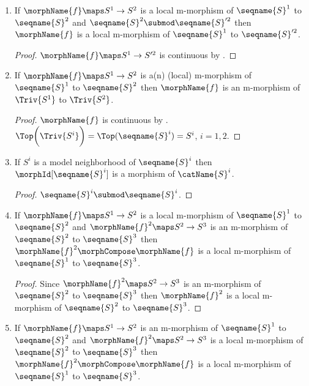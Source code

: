 \documentclass{article}
\begin{document}
\begin{corollary}
\begin{enumerate}
\end{enumerate}

\begin{enumerate}
\item
If $\morphName{f} \maps S^1 \to S^2$ is a local m-morphism of
$\seqname{S}^1$ to $\seqname{S}^2$ and
$\seqname{S}^2 \submod \seqname{S}'^2$ then
$\morphName{f}$ is a local m-morphism of $\seqname{S}^1$ to
$\seqname{S}'^2$.

\begin{proof}
$\morphName{f} \maps S^1 \to S'^2$ is continuous by
.
\end{proof}

\item
If $\morphName{f} \maps S^1 \to S^2$ is a(n) (local) m-morphism of
$\seqname{S}^1$ to $\seqname{S}^2$ then $\morphName{f}$ is an m-morphism
of $\Triv{S^1}$ to $\Triv{S^2}$.

\begin{proof}
$\morphName{f}$ is continuous by .
$
  \Top \biggl ( \Triv{S^i} \biggr ) =
  \Top(\seqname{S}^i) =
  S^i
$,
$i=1,2$.
\end{proof}

\item
If $S^i$ is a model neighborhood of $\seqname{S}^i$ then
$\morphId[{\seqname{S}^i}]$ is a morphism of $\catName{S}^i$.

\begin{proof}
$\seqname{S}^i \submod \seqname{S}^i$.
\end{proof}

\item
If $\morphName{f} \maps S^1 \to S^2$ is a local m-morphism of
$\seqname{S}^1$ to $\seqname{S}^2$ and
$\morphName{f}^2 \maps S^2 \to S^3$ is an m-morphism of $\seqname{S}^2$
to $\seqname{S}^3$ then $\morphName{f}^2 \morphCompose \morphName{f}$ is a
local m-morphism of $\seqname{S}^1$ to $\seqname{S}^3$.

\begin{proof}
Since $\morphName{f}^2 \maps S^2 \to S^3$ is an m-morphism of
$\seqname{S}^2$ to $\seqname{S}^3$ then $\morphName{f}^2$ is a local
m-morphism of $\seqname{S}^2$ to $\seqname{S}^3$.
\end{proof}

\item
If $\morphName{f} \maps S^1 \to S^2$ is an m-morphism of
$\seqname{S}^1$ to $\seqname{S}^2$ and
$\morphName{f}^2 \maps S^2 \to S^3$ is a local m-morphism of
$\seqname{S}^2$ to $\seqname{S}^3$ then
$\morphName{f}^2 \morphCompose \morphName{f}$ is a local m-morphism of
$\seqname{S}^1$ to $\seqname{S}^3$.


\end{enumerate}
\end{corollary}
\end{document}

